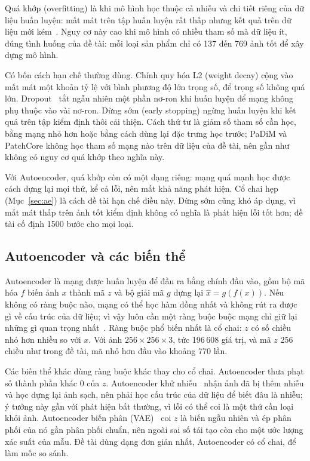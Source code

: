 Quá khớp (overfitting) là khi mô hình học thuộc cả nhiễu và chi tiết riêng của dữ liệu huấn luyện: mất mát trên
tập huấn luyện rất thấp nhưng kết quả trên dữ liệu mới kém~\cite{zhangGeneralization}. Nguy cơ này cao khi mô hình
có nhiều tham số mà dữ liệu ít, đúng tình huống của đề tài: mỗi loại sản phẩm chỉ có 137 đến 769 ảnh tốt để xây dựng
mô hình.

Có bốn cách hạn chế thường dùng. Chính quy hóa L2 (weight decay) cộng vào mất mát một khoản tỷ lệ với bình phương độ
lớn trọng số, để trọng số không quá lớn. Dropout~\cite{srivastavaDropoutSimpleWay2014} tắt ngẫu nhiên một phần nơ-ron
khi huấn luyện để mạng không phụ thuộc vào vài nơ-ron. Dừng sớm (early stopping) ngừng huấn luyện khi kết quả trên
tập kiểm định thôi cải thiện. Cách thứ tư là giảm số tham số cần học, bằng mạng nhỏ hơn hoặc bằng cách dùng lại đặc
trưng học trước; PaDiM và PatchCore không học tham số mạng nào trên dữ liệu của đề tài, nên gần như không có nguy cơ
quá khớp theo nghĩa này.

Với Autoencoder, quá khớp còn có một dạng riêng: mạng quá mạnh học được cách dựng lại mọi thứ, kể cả lỗi, nên mất
khả năng phát hiện. Cổ chai hẹp (Mục~\ref{sec:ae}) là cách đề tài hạn chế điều này. Dừng sớm cũng khó áp dụng, vì
mất mát thấp trên ảnh tốt kiểm định không có nghĩa là phát hiện lỗi tốt hơn; đề tài cố định 1500 bước cho mọi loại.

\subsection{Autoencoder và các biến thể}

Autoencoder là mạng được huấn luyện để đầu ra bằng chính đầu vào, gồm bộ mã hóa $f$ biến ảnh $x$ thành mã $z$ và bộ
giải mã $g$ dựng lại $\hat{x} = g(f(x))$. Nếu không có ràng buộc nào, mạng có thể học hàm đồng nhất và không rút ra
được gì về cấu trúc của dữ liệu; vì vậy luôn cần một ràng buộc buộc mạng chỉ giữ lại những gì quan trọng
nhất~\cite{goodfellowDeepLearning2016}. Ràng buộc phổ biến nhất là cổ chai: $z$ có số chiều nhỏ hơn nhiều so với $x$.
Với ảnh $256\times256\times3$, tức 196\,608 giá trị, và mã $z$ 256 chiều như trong đề tài, mã nhỏ hơn đầu vào khoảng
770 lần.

Các biến thể khác dùng ràng buộc khác thay cho cổ chai. Autoencoder thưa phạt số thành phần khác 0 của $z$.
Autoencoder khử nhiễu~\cite{vincentExtractingComposingRobust2008} nhận ảnh đã bị thêm nhiễu và học dựng lại ảnh sạch,
nên phải học cấu trúc của dữ liệu để biết đâu là nhiễu; ý tưởng này gần với phát hiện bất thường, vì lỗi có thể coi
là một thứ cần loại khỏi ảnh. Autoencoder biến phân (VAE)~\cite{kingmaAutoEncodingVariationalBayes2014} coi $z$ là
biến ngẫu nhiên và ép phân phối của nó gần phân phối chuẩn, nên ngoài sai số tái tạo còn cho một ước lượng xác suất
của mẫu. Đề tài dùng dạng đơn giản nhất, Autoencoder có cổ chai, để làm mốc so sánh.

